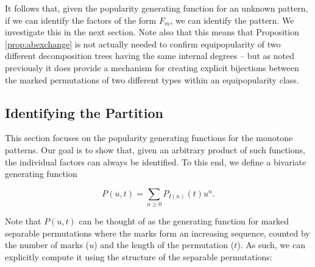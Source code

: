 \documentclass[10pt]{article}
\theoremstyle{definition}
\numberwithin{equation}{section}
\numberwithin{figure}{section}
\begin{document}
  It follows that, given the popularity generating function for an unknown pattern, if we can identify the factors of the form $F_m$, we can identify the pattern. We investigate this in the next section. Note also that this means that Proposition \ref{prop:abexchange} is not actually needed to confirm equipopularity of two different decomposition trees having the same internal degrees -- but as noted previously it does provide a mechanism for creating explicit bijections between the marked permutations of two different types within an equipopularity class.

\subsection{Identifying the Partition}

This section focuses on the popularity generating functions for the monotone patterns. Our goal is to show that, given an arbitrary product of such functions, the individual factors can always be identified. To this end, we define a bivariate generating function

\[
P(u,t) = \sum_{n\geq 0} P_{I(n)}(t)u^n.
\]

Note that $P(u,t)$ can be thought of as the generating function for marked separable permutations where the marks form an increasing sequence, counted by the number of marks ($u$) and the length of the permutation ($t$). As such,  
we can explicitly compute it using the structure of the separable permutations: 
\end{document}
